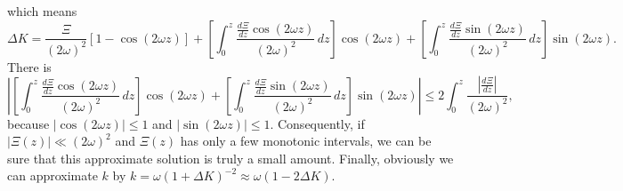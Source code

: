 \documentclass[
 jor,
 amsmath,amssymb,preprint,
]{revtex4-2}
\begin{document}
which means
\begin{equation}
    \Delta K=\frac{\Xi}{(2\omega)^2}[1-\cos(2\omega z)]+\left[\int_{0}^z\frac{\frac{d\Xi}{d z}\cos(2\omega z)}{(2\omega)^2}\,d z\right]\cos(2\omega z)+\left[\int_{0}^z\frac{\frac{d\Xi}{d z}\sin(2\omega z)}{(2\omega)^2}\,d z\right]\sin(2\omega z).
\end{equation}
There is
\begin{equation}
    \left\lvert \left[\int_{0}^z\frac{\frac{d\Xi}{d z}\cos(2\omega z)}{(2\omega)^2}\,d z\right]\cos(2\omega z)+\left[\int_{0}^z\frac{\frac{d\Xi}{d z}\sin(2\omega z)}{(2\omega)^2}\,d z\right]\sin(2\omega z)\right\rvert \leq 2\int_{0}^z\frac{\left\lvert \frac{d\Xi}{d z}\right\rvert }{(2\omega)^2},
\end{equation}
because $\left|\cos(2\omega z)\right|\leq1$ and $\left|\sin(2\omega z)\right|\leq1$. Consequently, if $\left|\Xi(z)\right|\ll(2\omega)^2$ and $\Xi(z)$ has only a few monotonic intervals, we can be sure that this approximate solution is truly a small amount. Finally, obviously we can approximate $k$ by $k=\omega(1+\Delta K)^{-2}\approx \omega(1-2\Delta K)$.

\begin{comment}
\begin{equation}
    H=C_+e^{-pz}e^{+i\omega\sqrt{1-(\frac{p}{\omega})^2}z}+C_-e^{-pz}e^{-i\omega\sqrt{1-(\frac{p}{\omega})^2}z}
\end{equation}
\begin{equation}
    H|_{z=0}=C_++C_-=1
\end{equation}
\begin{equation}
    \frac{d H}{d z}|_{z=0}=C_+(-p+i\omega\sqrt{1-(\frac{p}{\omega})^2})+C_-(-p-i\omega\sqrt{1-(\frac{p}{\omega})^2})=i\omega
\end{equation}
\begin{equation}
    C_\pm=\frac{1}{2}\pm\frac{1-\frac{p}{\omega}i}{2\sqrt{1-(\frac{p}{\omega})^2}}
\end{equation}
\begin{equation}
    H=(\frac{1}{2}+\frac{1-\frac{p}{\omega}i}{2\sqrt{1-(\frac{p}{\omega})^2}})e^{-pz}(\cos\omega\sqrt{1-(\frac{p}{\omega})^2}z+i\sin\omega\sqrt{1-(\frac{p}{\omega})^2}z)+(\frac{1}{2}-\frac{1-\frac{p}{\omega}i}{2\sqrt{1-(\frac{p}{\omega})^2}})e^{-pz}(\cos\omega\sqrt{1-(\frac{p}{\omega})^2}z-i\sin\omega\sqrt{1-(\frac{p}{\omega})^2}z)
\end{equation}
\begin{equation}
    H=[e^{-pz}\cos\omega\sqrt{1-(\frac{p}{\omega})^2}z+\frac{\frac{p}{\omega}}{\sqrt{1-(\frac{p}{\omega})^2}}e^{-pz}\sin\omega\sqrt{1-(\frac{p}{\omega})^2}z]+i[\frac{1}{\sqrt{1-(\frac{p}{\omega})^2}}e^{-pz}\sin\omega\sqrt{1-(\frac{p}{\omega})^2}z]
\end{equation}
\end{comment}
\end{document}
